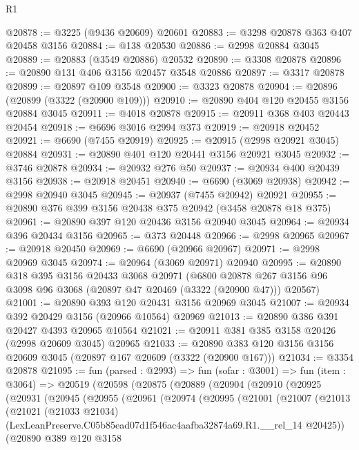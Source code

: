 \begin{lexlean}{R1}
\begin{coremodule}
@20878 := @3225 (@9436 @20609) @20601
@20883 := @3298 @20878 @363 @407 @20458 @3156
@20884 := @138 @20530
@20886 := @2998 @20884 @3045
@20889 := @20883 (@3549 @20886) @20532
@20890 := @3308 @20878
@20896 := @20890 @131 @406 @3156 @20457 @3548 @20886
@20897 := @3317 @20878
@20899 := @20897 @109 @3548
@20900 := @3323 @20878
@20904 := @20896 (@20899 (@3322 (@20900 @109)))
@20910 := @20890 @404 @120 @20455 @3156 @20884 @3045
@20911 := @4018 @20878
@20915 := @20911 @368 @403 @20443 @20454
@20918 := @6696 @3016 @2994 @373
@20919 := @20918 @20452
@20921 := @6690 (@7455 @20919)
@20925 := @20915 (@2998 @20921 @3045) @20884
@20931 := @20890 @401 @120 @20441 @3156 @20921 @3045
@20932 := @3746 @20878
@20934 := @20932 @276 @50
@20937 := @20934 @400 @20439 @3156
@20938 := @20918 @20451
@20940 := @6690 (@3069 @20938)
@20942 := @2998 @20940 @3045
@20945 := @20937 (@7455 @20942) @20921
@20955 := @20890 @376 @399 @3156 @20438 @375 @20942 (@3458 @20878 @18 @375)
@20961 := @20890 @397 @120 @20436 @3156 @20940 @3045
@20964 := @20934 @396 @20434 @3156
@20965 := @373 @20448
@20966 := @2998 @20965
@20967 := @20918 @20450
@20969 := @6690 (@20966 @20967)
@20971 := @2998 @20969 @3045
@20974 := @20964 (@3069 @20971) @20940
@20995 := @20890
    @318
    @395
    @3156
    @20433
    @3068
    @20971
    (@6800 @20878 @267 @3156 @96 @3098 @96 @3068 (@20897 @47 @20469 (@3322 (@20900 @47))) @20567)
@21001 := @20890 @393 @120 @20431 @3156 @20969 @3045
@21007 := @20934 @392 @20429 @3156 (@20966 @10564) @20969
@21013 := @20890 @386 @391 @20427 @4393 @20965 @10564
@21021 := @20911 @381 @385 @3158 @20426 (@2998 @20609 @3045) @20965
@21033 := @20890 @383 @120 @3156 @3156 @20609 @3045 (@20897 @167 @20609 (@3322 (@20900 @167)))
@21034 := @3354 @20878
@21095 := fun (parsed : @2993) =>
  fun (sofar : @3001) =>
  fun (item : @3064) =>
  @20519
    (@20598
      (@20875
        (@20889
          (@20904
            (@20910
              (@20925
                (@20931
                  (@20945
                    (@20955
                      (@20961
                        (@20974
                          (@20995
                            (@21001
                              (@21007
                                (@21013
                                  (@21021
                                    (@21033 @21034)
                                    (LexLeanPreserve.C05b85ead07d1f546ac4aafba32874a69.R1.__rel_14
                                      @20425))
                                  (@20890
                                    @389
                                    @120
                                    @3158

\end{coremodule}
\end{lexlean}
